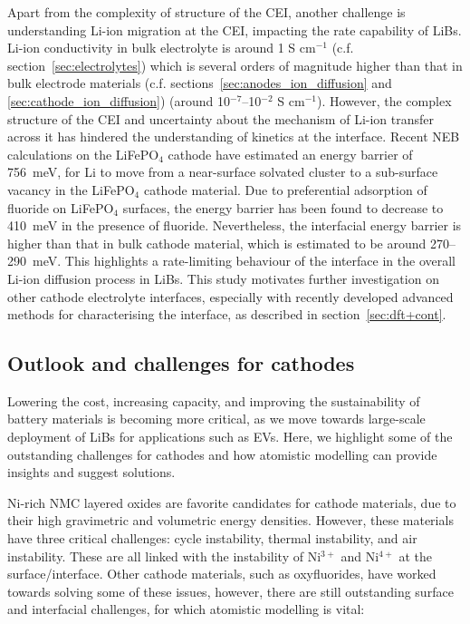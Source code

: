 \documentclass[../main.tex]{subfiles}
\begin{document}
Apart from the complexity of structure of the CEI, another challenge is understanding Li-ion migration at the CEI, impacting the rate capability of LiBs. Li-ion conductivity in bulk electrolyte is around 1 S cm$^{-1}$ (c.f. section~\ref{sec:electrolytes}) which is several orders of magnitude higher than that in bulk electrode materials (c.f. sections~\ref{sec:anodes_ion_diffusion} and \ref{sec:cathode_ion_diffusion}) (around 10$^{-7}$--10$^{-2}$ S cm$^{-1}$).\cite{park2010review, VanDerVen2013} However, the complex structure of the CEI and uncertainty about the mechanism of Li-ion transfer across it has hindered the understanding of kinetics at the interface. Recent NEB calculations on the LiFePO$_4$ cathode have estimated an energy barrier of 756~meV, for Li to move from a near-surface solvated cluster to a sub-surface vacancy in the LiFePO$_4$ cathode material.\cite{Bhandari2019} Due to preferential adsorption of fluoride on LiFePO$_4$ surfaces,\cite{Edstrom2004,Bhandari2020} the energy barrier has been found to decrease to 410~meV in the presence of fluoride. Nevertheless, the interfacial energy barrier is higher than that in bulk cathode material, which is estimated to be around 270--290~meV.\cite{Morgan2004,Dathar2011} This highlights a rate-limiting behaviour of the interface in the overall Li-ion diffusion process in LiBs. This study motivates further investigation on other cathode electrolyte interfaces, especially with recently developed advanced methods for characterising the interface, as described in section~\ref{sec:dft+cont}.

\subsection{Outlook and challenges for cathodes}
\label{sec:cathodes_outlook}
Lowering the cost, increasing capacity, and improving the sustainability of battery materials is becoming more critical, as we move towards large-scale deployment of LiBs for applications such as EVs.\cite{dunn2011electrical} Here, we highlight some of the outstanding challenges for cathodes and how atomistic modelling can provide insights and suggest solutions.

Ni-rich NMC layered oxides are favorite candidates for cathode materials, due to their high gravimetric and volumetric energy densities.\cite{li2020high} However, these materials have three critical challenges: cycle instability, thermal instability, and air instability. These are all linked with the instability of Ni$^{3+}$ and Ni$^{4+}$ at the surface/interface. Other cathode materials, such as oxyfluorides, have worked towards solving some of these issues, however, there are still outstanding surface and interfacial challenges, for which atomistic modelling is vital:
\end{document}
